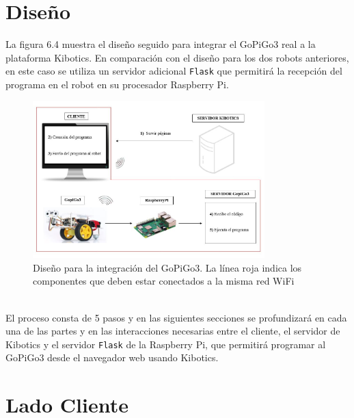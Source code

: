 \documentclass{report}
\begin{document}
\section{Diseño}

La figura 6.4 muestra el diseño seguido para integrar el GoPiGo3 real a la plataforma Kibotics. En comparación con el diseño para los dos robots anteriores, en este caso se utiliza un servidor adicional \texttt{Flask} que permitirá la recepción del programa en el robot en su procesador Raspberry Pi.
\\
\begin{figure}[h!]
  \centering
    \includegraphics[width=0.8\textwidth]{images/arquitectura_GoPiGo.png}
  \caption{Diseño para la integración del GoPiGo3. La línea roja indica los componentes que deben estar conectados a la misma red WiFi}
  \label{Diseño para la integración del GoPiGo3}
\end{figure}
\\
El proceso consta de 5 pasos y en las siguientes secciones se profundizará en cada una de las partes y en las interacciones necesarias entre el cliente, el servidor de Kibotics y el servidor \texttt{Flask} de la Raspberry Pi, que permitirá programar al GoPiGo3 desde el navegador web usando Kibotics.

\section{Lado Cliente}
\end{document}
